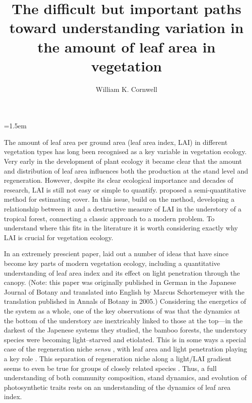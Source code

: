\documentclass[11pt]{article}
\title{The difficult but important paths toward understanding variation in the amount of leaf area in vegetation}
\author[1]{
William K. Cornwell
}
\date{}
\affil[1] {Ecology and Evolution Research Centre, School of Biological, Earth and Environmental Sciences, University of New South Wales, Sydney, NSW 2052, Australia. Email for correspondence: \texttt{wcornwell@gmail.com}\\}
\begin{document}
	
\maketitle

\newpage	
	
	\parindent=1.5em
	\addtolength{\parskip}{.3em}
	\vfill
	
	\newpage
	
	The amount of leaf area per ground area (leaf area index, LAI) in different vegetation types has long been recognised as a key variable in vegetation ecology.  Very early in the development of plant ecology it became clear that the amount and distribution of leaf area influences both the production at the stand level and regeneration.  However, despite its clear ecological importance and decades of research, LAI is still not easy or simple to quantify.  \citet{braun1932plant} proposed a semi-quantitative method for estimating cover.  In this issue, \cite{dobert2015can} build on the  \citet{braun1932plant} method, developing a relationship between it and a destructive measure of LAI in the understory of a tropical forest, connecting a classic approach to a modern problem.  To understand where this fits in the literature it is worth considering exactly why LAI is crucial for vegetation ecology.  
	
	In an extremely prescient paper, \citet{monsi1953uber} laid out a number of ideas that have since become key parts of modern vegetation ecology, including a  quantitative understanding of leaf area index and its effect on light penetration through the canopy. (Note: this paper was originally published in German in the Japanese Journal of Botany and translated into English by Marcus Schortemeyer with the translation published in Annals of Botany in 2005.)  Considering the energetics of the system as a whole, one of the key observations of \citet{monsi1953uber} was that the dynamics at the bottom of the understory are inextricably linked to those at the top---in the darkest of the Japenese systems they studied, the bamboo forests, the understory species were becoming light--starved and etiolated. This is in some ways a special case of the regeneration niche \emph{sensu} \citet{grubb1977maintenance}, with leaf area and light penetration playing a key role \citep[see also][]{valladares2008shade}.  This separation of regeneration niche along a light/LAI gradient seems to even be true for groups of closely related species \citep[e.g. Hawaiian lobeliads, see][]{givnish2004adaptive}.  Thus, a full understanding of both community composition, stand dynamics, and evolution of photosynthetic traits rests on an understanding of the dynamics of leaf area index.  
	
\end{document}
